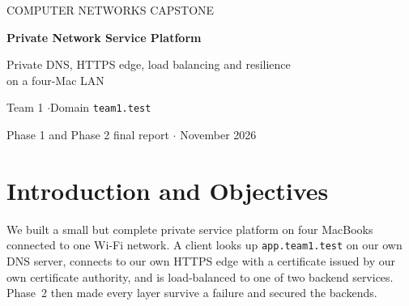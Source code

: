 \documentclass[11pt,a4paper]{article}
\newcommand{\cmd}[1]{\texttt{#1}}
\begin{document}
\sloppy

\begin{titlepage}
\centering
\vspace*{3cm}
{\color{teal}\large COMPUTER NETWORKS CAPSTONE\par}
\vspace{0.6cm}
{\color{ink}\Huge\bfseries Private Network Service Platform\par}
\vspace{0.4cm}
{\Large Private DNS, HTTPS edge, load balancing and resilience\\ on a four-Mac LAN\par}
\vspace{1.5cm}
\vfill
{\large Team 1 \quad$\cdot$\quad Domain \texttt{team1.test}\par}
\vspace{0.3cm}
{\normalsize Phase 1 and Phase 2 final report \quad$\cdot$ November 2026\par}
\vspace{2cm}
\end{titlepage}

\tableofcontents
\newpage

\section{Introduction and Objectives}

We built a small but complete private service platform on four MacBooks
connected to one Wi-Fi network. A client looks up \cmd{app.team1.test} on our
own DNS server, connects to our own HTTPS edge with a certificate issued by our
own certificate authority, and is load-balanced to one of two backend
services. Phase~2 then made every layer survive a failure and secured the
backends.
\end{document}
